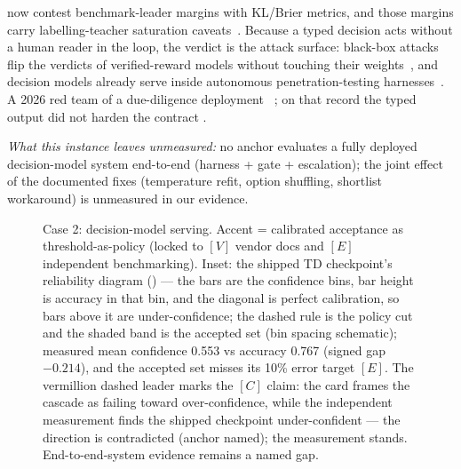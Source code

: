 now contest benchmark-leader margins with KL/Brier metrics, and those margins carry
labelling-teacher saturation caveats~\cite{id261020778}. Because a typed decision acts without
a human reader in the loop, the verdict is the attack surface: black-box attacks flip the
verdicts of verified-reward models without touching their weights~\cite{id260931142}, and
decision models already serve inside autonomous penetration-testing
harnesses~\cite{id260928940}. A 2026 red team of a due-diligence deployment ~\cite{checkpoint2026jevredteam}; on that record the typed output did not harden the contract \evjudge{}.

\emph{What this instance leaves unmeasured:} no anchor evaluates a fully deployed decision-model system end-to-end (harness + gate + escalation); the joint effect of the documented fixes (temperature refit, option shuffling, shortlist workaround) is unmeasured in our evidence.

\begin{figure}[h!]
  \centering
  \resizebox{\linewidth}{!}{}
  \caption{ Case 2: decision-model serving. Accent = calibrated acceptance as threshold-as-policy (locked to $[V]$ vendor docs and $[E]$ independent benchmarking). Inset: the shipped TD checkpoint's reliability diagram (\cite{id260933843}) --- the bars are the confidence bins, bar height is accuracy in that bin, and the diagonal is perfect calibration, so bars above it are under-confidence; the dashed rule is the policy cut and the shaded band is the accepted set (bin spacing schematic); measured mean confidence 0.553 vs accuracy 0.767 (signed gap $-0.214$), and the accepted set misses its 10\% error target $[E]$. The vermillion dashed leader marks the $[C]$ claim: the card frames the cascade as failing toward over-confidence, while the independent measurement finds the shipped checkpoint under-confident --- the direction is contradicted (anchor named); the measurement stands. End-to-end-system evidence remains a named gap.}
  \label{fig:case-decision}
\end{figure}


